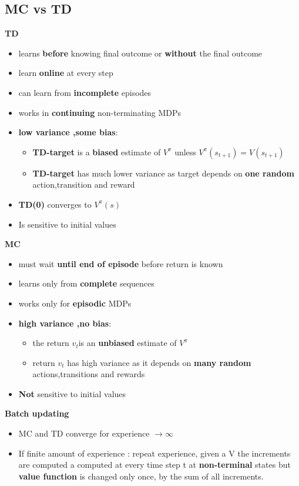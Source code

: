 \documentclass[12pt]{article} %
\begin{document}
\subsection{MC vs TD}
\textbf{TD}
\begin{itemize}
\item learns \textbf{before} knowing final outcome or \textbf{without} the final outcome
\item learn \textbf{online} at every step
\item can learn from \textbf{incomplete} episodes
\item works in \textbf{continuing} non-terminating MDPs
\item \textbf{low variance ,some bias}:
\begin{itemize}
\item \textbf{TD-target} is a \textbf{biased} estimate of $V^{\pi}$ unless $V^{\pi}(s_{t+1}) = V(s_{t+1})$
\item \textbf{TD-target} has much lower variance as target depends on \textbf{one random} action,transition and reward
\end{itemize}
\item \textbf{TD(0)} converges to $V^{\pi}(s)$
\item Is sensitive to initial values
\end{itemize}
\textbf{MC}
\begin{itemize}
\item must wait \textbf{until end of episode} before return is known
\item learns only from \textbf{complete} sequences
\item works only for \textbf{episodic} MDPs
\item \textbf{high variance ,no bias}:
\begin{itemize}
\item the return $v_t $is an \textbf{unbiased} estimate of $V^{\pi}$ 
\item return $v_t$ has high variance as it depends on \textbf{many random} actions,transitions and rewards
\end{itemize}
\item \textbf{Not} sensitive to initial values
\end{itemize}
\textbf{Batch updating}
\begin{itemize}
\item MC and TD converge for experience $\to \infty$
\item If finite amount of experience : repeat experience, given a V the increments are computed a computed at every time step t at \textbf{non-terminal} states but \textbf{value function} is changed only once, by the sum of all increments.
\end{itemize}
\end{document}
